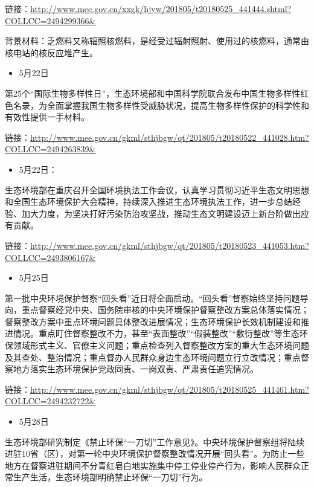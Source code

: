 \documentclass[
]{book}
\providecommand{\tightlist}{%
  \setlength{\itemsep}{0pt}\setlength{\parskip}{0pt}}
\begin{document}
链接：\url{http://www.mee.gov.cn/xxgk/hjyw/201805/t20180525_441444.shtml?COLLCC=2494299366\&}

背景材料：乏燃料又称辐照核燃料，是经受过辐射照射、使用过的核燃料，通常由核电站的核反应堆产生。

\begin{itemize}
\tightlist
\item
  5月22日
\end{itemize}

第25个``国际生物多样性日''，生态环境部和中国科学院联合发布中国生物多样性红色名录，为全面掌握我国生物多样性受威胁状况，提高生物多样性保护的科学性和有效性提供一手材料。

链接：\url{http://www.mee.gov.cn/gkml/sthjbgw/qt/201805/t20180522_441028.htm?COLLCC=2494263839\&}

\begin{itemize}
\tightlist
\item
  5月22日：
\end{itemize}

生态环境部在重庆召开全国环境执法工作会议，认真学习贯彻习近平生态文明思想和全国生态环境保护大会精神，持续深入推进生态环境执法工作，进一步总结经验、加大力度，为坚决打好污染防治攻坚战，推动生态文明建设迈上新台阶做出应有贡献。

链接：\url{http://www.mee.gov.cn/gkml/sthjbgw/qt/201805/t20180523_441053.htm?COLLCC=2493806167\&}

\begin{itemize}
\tightlist
\item
  5月25日
\end{itemize}

第一批中央环境保护督察``回头看''近日将全面启动。``回头看''督察始终坚持问题导向，重点督察经党中央、国务院审核的中央环境保护督察整改方案总体落实情况；督察整改方案中重点环境问题具体整改进展情况；生态环境保护长效机制建设和推进情况。重点盯住督察整改不力，甚至``表面整改''``假装整改''``敷衍整改''等生态环保领域形式主义、官僚主义问题；重点检查列入督察整改方案的重大生态环境问题及其查处、整治情况；重点督办人民群众身边生态环境问题立行立改情况；重点督察地方落实生态环境保护党政同责、一岗双责、严肃责任追究情况。

链接：\url{http://www.mee.gov.cn/gkml/sthjbgw/qt/201805/t20180525_441461.htm?COLLCC=2494232722\&}

\begin{itemize}
\tightlist
\item
  5月28日
\end{itemize}

生态环境部研究制定《禁止环保``一刀切''工作意见》。中央环境保护督察组将陆续进驻10省（区），对第一轮中央环境保护督察整改情况开展``回头看''。为防止一些地方在督察进驻期间不分青红皂白地实施集中停工停业停产行为，影响人民群众正常生产生活，生态环境部明确禁止环保``一刀切''行为。
\end{document}
